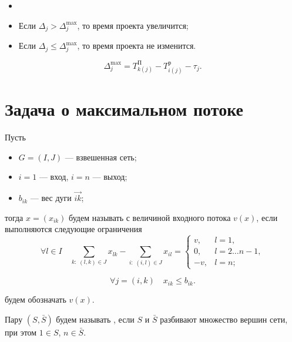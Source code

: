 \implication

\begin{itemize}[nosep]
	\item[]
	
	\item Если $\Delta_j > \Delta_j^{\max}$, то время проекта увеличится;
	
	\item Если $\Delta_j \le \Delta_j^{\max}$, то время проекта не изменится.
\end{itemize}

\implication

\[
\Delta_j^{\max} = T_{k(j)}^{\text{П}} - T_{i(j)}^{\text{р}} - \tau_j.
\]

\section{Задача о максимальном потоке}


Пусть
\begin{itemize}[nosep]
	\item $G = (I, J)$ --- взвешенная сеть;
	
	\item $i = 1$ --- вход, $i = n$ --- выход;
	
	\item $b_{ik}$ --- вес дуги $\vec{ik}$;
\end{itemize}

тогда $x = (x_{ik})$ будем называть  с величиной входного потока $v(x)$, если выполняются следующие ограничения
\[
\forall l \in I \quad \sum_{k:\;(l, k) \in J} x_{lk} - \sum_{i: \; (i, l) \in J} x_{il} = \begin{cases}
	v, & l = 1, \\
	0, & l = 2 \dots n-1, \\
	-v, & l = n;
\end{cases}\tag{1}
\]

\[
\forall j = (i, k) \quad x_{ik} \le b_{ik}\tag{2}.
\]


 будем обозначать $v(x)$.


Пару $(S, \bar{S})$ будем называть , если $S$ и $\bar{S}$ разбивают множество вершин сети, при этом $1 \in S$, $n \in \bar{S}$.


